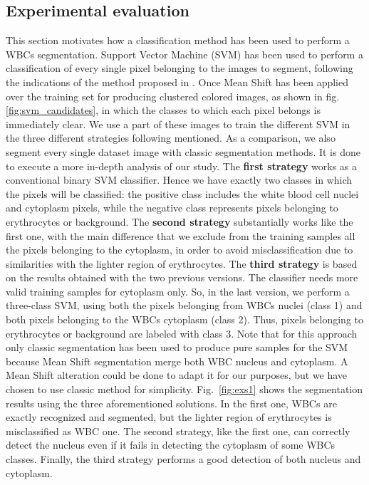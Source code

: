 \documentclass[final,a4paper,12pt,english]{UnicaPhdThesis3}
\begin{document}
{\subsection{Experimental evaluation}
\label{sec:experimental_evaluation}
This section motivates how a classification method has been used to perform a WBCs segmentation. Support Vector Machine (SVM) has been used to perform a classification of every single pixel belonging to the images to segment, following the indications of the method proposed in \cite{Pan}. Once Mean Shift has been applied over the training set for producing clustered colored images, as shown in fig. \ref{fig:svm_candidates}, in which the classes to which each pixel belongs is immediately clear. We use a part of these images to train the different SVM in the three different strategies following mentioned. As a comparison, we also segment every single dataset image with classic segmentation methods. It is done to execute a more in-depth analysis of our study. The \textbf{first strategy} works as a conventional binary SVM classifier. Hence we have exactly two classes in which the pixels will be classified: the positive class includes the white blood cell nuclei and cytoplasm pixels, while the negative class represents pixels belonging to erythrocytes or background. The \textbf{second strategy} substantially works like the first one, with the main difference that we exclude from the training samples all the pixels belonging to the cytoplasm, in order to avoid misclassification due to similarities with the lighter region of erythrocytes. The \textbf{third strategy} is based on the results obtained with the two previous versions. The classifier needs more valid training samples for cytoplasm only. So, in the last version, we perform a three-class SVM, using both the pixels belonging from WBCs nuclei (class 1) and both pixels belonging to the WBCs cytoplasm (class 2). Thus, pixels belonging to erythrocytes or background are labeled with class 3. Note that for this approach only classic segmentation has been used to produce pure samples for the SVM because Mean Shift segmentation merge both WBC nucleus and cytoplasm. A Mean Shift alteration could be done to adapt it for our purposes, but we have chosen to use classic method for simplicity. Fig.~\ref{fig:exs1} shows the segmentation results using the three aforementioned solutions. In the first one, WBCs are exactly recognized and segmented, but the lighter region of erythrocytes is misclassified as WBC one. The second strategy, like the first one, can correctly detect the nucleus even if it fails in detecting the cytoplasm of some WBCs classes.  Finally, the third strategy performs a good detection of both nucleus and cytoplasm.

}
\end{document}
